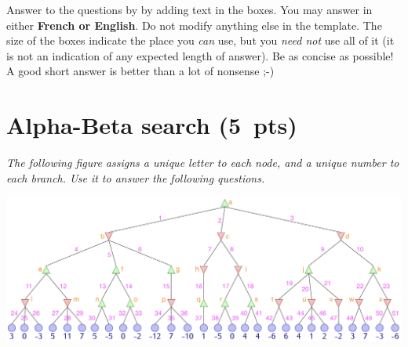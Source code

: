 \documentclass[11pt,a4paper]{report}
\begin{document}
\maketitle

Answer to the questions by by adding text in the boxes. You may answer in either \textbf{French or English}. Do not modify anything else in the template.  The size of the boxes indicate the place you \textit{can} use, but you \textit{need not} use all of it (it is not an indication of any expected length of answer). Be as concise as possible! A good short answer is better than a lot of nonsense ;-)
\bigskip

\section{Alpha-Beta search (5~pts)}

\textit{The following figure assigns a unique letter to each node, and a unique number to each branch. Use it to answer the following questions.}
\begin{center}
\includegraphics[scale=.3]{minimax_labelled.png}
\end{center}
\end{document}
